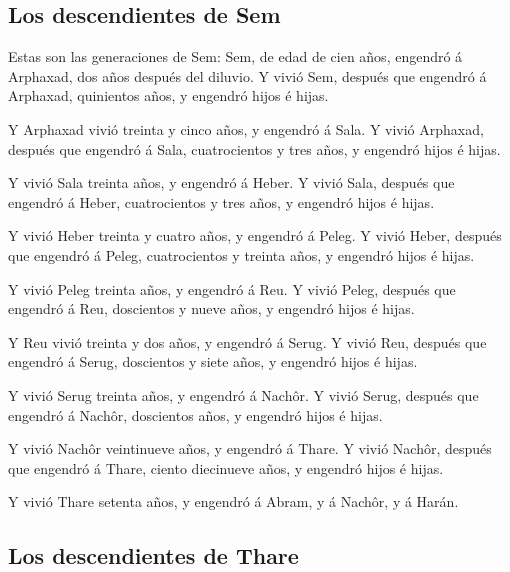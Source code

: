 \hypertarget{los-descendientes-de-sem}{%
\subsection{Los descendientes de Sem}\label{los-descendientes-de-sem}}

 Estas son las generaciones de Sem: Sem, de edad de cien
años, engendró á Arphaxad, dos años después del diluvio. 
Y vivió Sem, después que engendró á Arphaxad, quinientos años, y
engendró hijos é hijas.

 Y Arphaxad vivió treinta y cinco años, y engendró á
Sala.  Y vivió Arphaxad, después que engendró á Sala,
cuatrocientos y tres años, y engendró hijos é hijas.

 Y vivió Sala treinta años, y engendró á Heber.
 Y vivió Sala, después que engendró á Heber,
cuatrocientos y tres años, y engendró hijos é hijas.

 Y vivió Heber treinta y cuatro años, y engendró á Peleg.
 Y vivió Heber, después que engendró á Peleg,
cuatrocientos y treinta años, y engendró hijos é hijas.

 Y vivió Peleg treinta años, y engendró á Reu.
 Y vivió Peleg, después que engendró á Reu, doscientos y
nueve años, y engendró hijos é hijas.

 Y Reu vivió treinta y dos años, y engendró á Serug.
 Y vivió Reu, después que engendró á Serug, doscientos y
siete años, y engendró hijos é hijas.

 Y vivió Serug treinta años, y engendró á Nachôr.
 Y vivió Serug, después que engendró á Nachôr, doscientos
años, y engendró hijos é hijas.

 Y vivió Nachôr veintinueve años, y engendró á Thare.
 Y vivió Nachôr, después que engendró á Thare, ciento
diecinueve años, y engendró hijos é hijas.

 Y vivió Thare setenta años, y engendró á Abram, y á
Nachôr, y á Harán.

\hypertarget{los-descendientes-de-thare}{%
\subsection{Los descendientes de
Thare}\label{los-descendientes-de-thare}}

